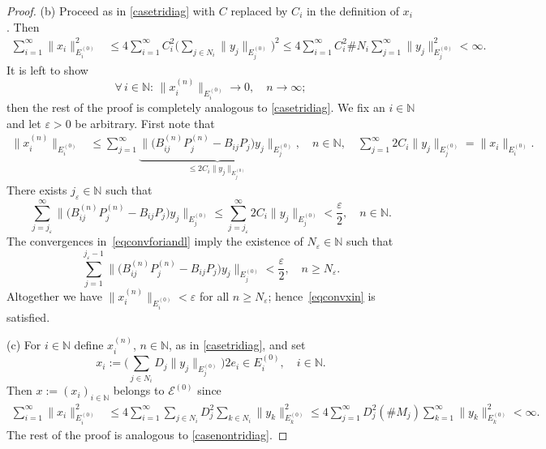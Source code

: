 \documentclass[a4paper,reqno]{amsart}
\begin{document}
\begin{proof}
(b) Proceed as in \ref{casetridiag} with $C$ replaced by $C_i$ in the definition of $x_i$. Then
\begin{align*}
\sum_{i=1}^{\infty}\|x_i\|_{E_i^{(0)}}^2
&\leq 4\sum_{i=1}^{\infty}C_i^2\Bigg(\sum_{j\in N_i} \|y_j\|_{E_j^{(0)}}\Bigg)^2
\leq  4\sum_{i=1}^{\infty}C_i^2 \# N_i \sum_{j=1}^{\infty}\|y_j\|_{E_j^{(0)}}^2<\infty.
\end{align*}
It is left to show 
\begin{equation} \forall\,i\in{\mathbb{N}}:\,\big\|x_i^{(n)}\big\|_{E_i^{(0)}}{\longrightarrow} 0, \quad n\to\infty;\label{eqconvxin}\end{equation}
then the rest of the proof is completely analogous to \ref{casetridiag}.
We fix an $i\in{\mathbb{N}}$ and let $\varepsilon>0$ be arbitrary. 
First note that 
\begin{align*}\big\|x_i^{(n)}\big\|_{E_i^{(0)}}&\leq \sum_{j=1}^{\infty}\underbrace{\big\|\big(B_{ij}^{(n)}P_j^{(n)}- B_{ij}P_j\big)y_j\big\|_{E_j^{(0)}}}_{\leq 2C_i\|y_j\|_{E_j^{(0)}}}, \quad n\in{\mathbb{N}}, 
\quad \sum_{j=1}^{\infty}2C_i\|y_j\|_{E_j^{(0)}} =\|x_i\|_{E_i^{(0)}}.
\end{align*}
There exists $j_\varepsilon\in{\mathbb{N}}$ such that $$  \sum_{j=j_\varepsilon}^{\infty}\big\|\big(B_{ij}^{(n)}P_j^{(n)}- B_{ij}P_j\big)y_j\big\|_{E_j^{(0)}}\leq \sum_{j=j_\varepsilon}^{\infty} 2C_i \|y_j\|_{E_j^{(0)}}<\frac\varepsilon{2}, \quad n\in{\mathbb{N}}.$$
The convergences in~\eqref{eqconvforiandl} imply the existence of $N_\varepsilon\in{\mathbb{N}}$ such that $$ \sum_{j=1}^{j_\varepsilon-1}\big\|\big(B_{ij}^{(n)}P_j^{(n)}- B_{ij}P_j\big)y_j\big\|_{E_j^{(0)}}<\frac\varepsilon{2}, \quad n\geq N_\varepsilon.$$
Altogether we have $\big\|x_i^{(n)}\big\|_{E_i^{(0)}}<\varepsilon$ for all $n\geq N_\varepsilon$; hence~\eqref{eqconvxin} is satisfied.

(c) For $i\in{\mathbb{N}}$ define $x_i^{(n)}$, $n\in{\mathbb{N}}$, as in \ref{casetridiag}, and set 
$$x_i:=\bigg(\sum_{j\in N_i} D_j \|y_j\|_{E_j^{(0)}}\bigg)2e_i\in E_i^{(0)}, \quad i\in{\mathbb{N}}.$$
Then $x:=(x_i)_{i\in{\mathbb{N}}}$ belongs to ${\mathcal E}^{(0)}$ since 
\begin{align*}
\sum_{i=1}^{\infty}\|x_i\|_{E_i^{(0)}}^2& 
\leq 4 \sum_{i=1}^{\infty}\sum_{j\in N_i} D_j^2\sum_{k\in N_i} \|y_{k}\|_{E_{k}^{(0)}}^2
\leq 4 \sum_{j=1}^{\infty} D_j^2 (\# M_j) \sum_{k=1}^{\infty} \|y_{k}\|_{E_{k}^{(0)}}^2<\infty.
\end{align*}
The rest of the proof is analogous to \ref{casenontridiag}.
\end{proof}
\end{document}
